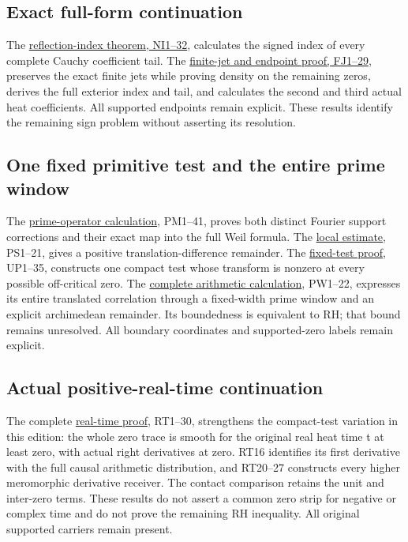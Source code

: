 \documentclass[
  10pt,
  a4paper,
]{article}
\begin{document}
\subsection{Exact full-form
continuation}\label{exact-full-form-continuation}

The \href{CAUCHY_REFLECTION_INDEX_DERIVATION.md}{reflection-index
theorem, NI1--32}, calculates the signed index of every complete Cauchy
coefficient tail. The
\href{FINITE_JET_COMPLEMENT_AND_HEAT_TRUNCATION.md}{finite-jet and
endpoint proof, FJ1--29}, preserves the exact finite jets while proving
density on the remaining zeros, derives the full exterior index and
tail, and calculates the second and third actual heat coefficients. All
supported endpoints remain explicit. These results identify the
remaining sign problem without asserting its resolution.

\subsection{One fixed primitive test and the entire prime
window}\label{one-fixed-primitive-test-and-the-entire-prime-window}

The \href{PRIME_PROJECTOR_MOBIUS_DERIVATION.md}{prime-operator
calculation}, PM1--41, proves both distinct Fourier support corrections
and their exact map into the full Weil formula. The
\href{PRIMITIVE_SHORT_SUPPORT_DERIVATION.md}{local estimate}, PS1--21,
gives a positive translation-difference remainder. The
\href{UNIVERSAL_PRIMITIVE_TRANSLATION_CRITERION.md}{fixed-test proof},
UP1--35, constructs one compact test whose transform is nonzero at every
possible off-critical zero. The
\href{PRIMITIVE_PRIME_WINDOW_DERIVATION.md}{complete arithmetic
calculation}, PW1--22, expresses its entire translated correlation
through a fixed-width prime window and an explicit archimedean
remainder. Its boundedness is equivalent to RH; that bound remains
unresolved. All boundary coordinates and supported-zero labels remain
explicit.

\subsection{Actual positive-real-time
continuation}\label{actual-positive-real-time-continuation}

The complete \href{REAL_TIME_HEAT_TRACE_DERIVATION.md}{real-time proof},
RT1--30, strengthens the compact-test variation in this edition: the
whole zero trace is smooth for the original real heat time t at least
zero, with actual right derivatives at zero. RT16 identifies its first
derivative with the full causal arithmetic distribution, and RT20--27
constructs every higher meromorphic derivative receiver. The contact
comparison retains the unit and inter-zero terms. These results do not
assert a common zero strip for negative or complex time and do not prove
the remaining RH inequality. All original supported carriers remain
present.
\end{document}

